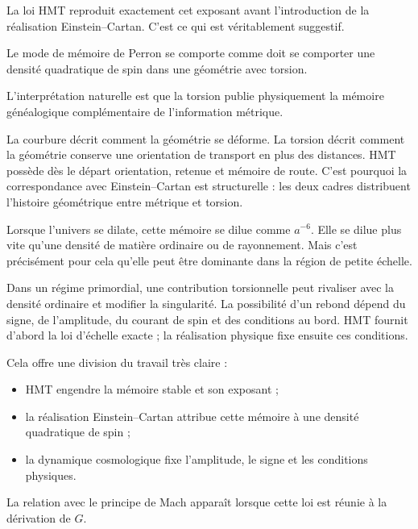 La loi HMT reproduit exactement cet exposant avant l’introduction de la réalisation Einstein–Cartan. C’est ce qui est véritablement suggestif.\par

Le mode de mémoire de Perron se comporte comme doit se comporter une densité quadratique de spin dans une géométrie avec torsion.\par

L’interprétation naturelle est que la torsion publie physiquement la mémoire généalogique complémentaire de l’information métrique.\par

La courbure décrit comment la géométrie se déforme. La torsion décrit comment la géométrie conserve une orientation de transport en plus des distances. HMT possède dès le départ orientation, retenue et mémoire de route. C’est pourquoi la correspondance avec Einstein–Cartan est structurelle : les deux cadres distribuent l’histoire géométrique entre métrique et torsion.\par

Lorsque l’univers se dilate, cette mémoire se dilue comme \(a^{-6}\). Elle se dilue plus vite qu’une densité de matière ordinaire ou de rayonnement. Mais c’est précisément pour cela qu’elle peut être dominante dans la région de petite échelle.\par

Dans un régime primordial, une contribution torsionnelle peut rivaliser avec la densité ordinaire et modifier la singularité. La possibilité d’un rebond dépend du signe, de l’amplitude, du courant de spin et des conditions au bord. HMT fournit d’abord la loi d’échelle exacte ; la réalisation physique fixe ensuite ces conditions.\par

Cela offre une division du travail très claire :\par

\begin{itemize}[leftmargin=*,itemsep=0.35em]
\item HMT engendre la mémoire stable et son exposant ;
\item la réalisation Einstein–Cartan attribue cette mémoire à une densité quadratique de spin ;
\item la dynamique cosmologique fixe l’amplitude, le signe et les conditions physiques.
\end{itemize}

La relation avec le principe de Mach apparaît lorsque cette loi est réunie à la dérivation de \(G\).\par

